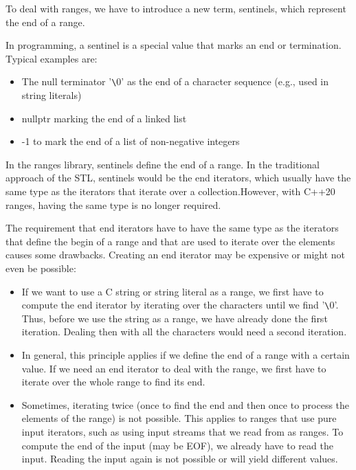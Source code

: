 
To deal with ranges, we have to introduce a new term, sentinels, which represent the end of a range.

In programming, a sentinel is a special value that marks an end or termination. Typical examples are:

\begin{itemize}
\item
The null terminator ’\verb|\|0’ as the end of a character sequence (e.g., used in string literals)

\item
nullptr marking the end of a linked list

\item
-1 to mark the end of a list of non-negative integers
\end{itemize}

In the ranges library, sentinels define the end of a range. In the traditional approach of the STL, sentinels would be the end iterators, which usually have the same type as the iterators that iterate over a collection.However, with C++20 ranges, having the same type is no longer required.

The requirement that end iterators have to have the same type as the iterators that define the begin of a range and that are used to iterate over the elements causes some drawbacks. Creating an end iterator may be expensive or might not even be possible:

\begin{itemize}
\item
If we want to use a C string or string literal as a range, we first have to compute the end iterator by iterating over the characters until we find ’\verb|\|0’. Thus, before we use the string as a range, we have already done the first iteration. Dealing then with all the characters would need a second iteration.

\item
In general, this principle applies if we define the end of a range with a certain value. If we need an end iterator to deal with the range, we first have to iterate over the whole range to find its end.

\item
Sometimes, iterating twice (once to find the end and then once to process the elements of the range) is not possible. This applies to ranges that use pure input iterators, such as using input streams that we read from as ranges. To compute the end of the input (may be EOF), we already have to read the input. Reading the input again is not possible or will yield different values.
\end{itemize}

